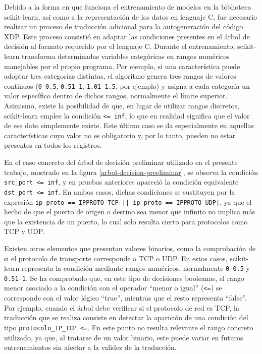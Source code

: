 Debido a la forma en que funciona el entrenamiento de modelos en la biblioteca scikit-learn, así como a la representación de los datos en lenguaje C, fue necesario realizar un proceso de traducción adicional para la autogeneración del código XDP. Este proceso consistió en adaptar las condiciones presentes en el árbol de decisión al formato requerido por el lenguaje C. Durante el entrenamiento, scikit-learn transforma determinadas variables categóricas en rangos numéricos manejables por el propio programa. Por ejemplo, si una característica puede adoptar tres categorías distintas, el algoritmo genera tres rangos de valores continuos (\verb|0–0.5|, \verb|0.51–1|, \verb|1.01–1.5|, por ejemplo) y asigna a cada categoría un valor específico dentro de dichos rangos, normalmente el límite superior. Asimismo, existe la posibilidad de que, en lugar de utilizar rangos discretos, scikit-learn emplee la condición \verb|<= inf|, lo que en realidad significa que el valor de ese dato simplemente existe. Este último caso se da especialmente en aquellas características cuyo valor no es obligatorio y, por lo tanto, pueden no estar presentes en todos los registros.

En el caso concreto del árbol de decisión preliminar utilizado en el presente trabajo, mostrado en la figura \ref{arbol-decision-preeliminar}, se observa la condición \verb|src_port <= inf|, y en pruebas anteriores apareció la condición equivalente \verb|dst_port <= inf|. En ambos casos, dichas condiciones se sustituyen por la expresión \verb#ip_proto == IPPROTO_TCP || ip_proto == IPPROTO_UDP|#, ya que el hecho de que el puerto de origen o destino sea menor que infinito no implica más que la existencia de un puerto, lo cual solo resulta cierto para protocolos como TCP y UDP.

Existen otros elementos que presentan valores binarios, como la comprobación de si el protocolo de transporte corresponde a TCP o UDP. En estos casos, scikit-learn representa la condición mediante rangos numéricos, normalmente \verb|0-0.5| y \verb|0.51-1|. Se ha comprobado que, en este tipo de decisiones booleanas, el rango menor asociado a la condición con el operador ``menor o igual'' (\verb|<=|) se corresponde con el valor lógico ``true'', mientras que el resto representa ``false''. Por ejemplo, cuando el árbol debe verificar si el protocolo de red es TCP, la traducción que se realiza consiste en detectar la aparición de una condición del tipo \verb|protocolo_IP_TCP <=|. En este punto no resulta relevante el rango concreto utilizado, ya que, al tratarse de un valor binario, este puede variar en futuros entrenamientos sin afectar a la validez de la traducción.

